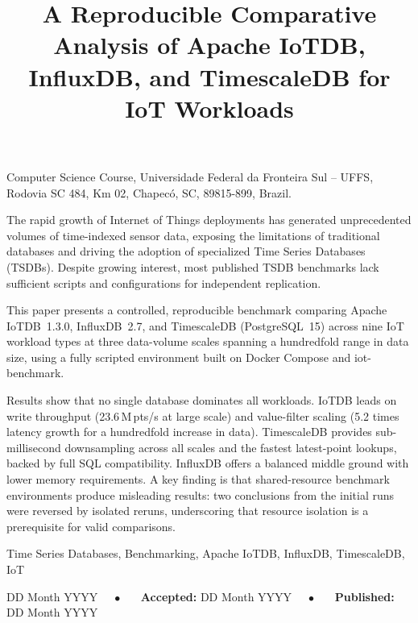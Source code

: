 \documentclass[english]{presets/sbcreviews-2025}%
\title[A Reproducible Comparative Analysis of Apache IoTDB, InfluxDB, and TimescaleDB for IoT Workloads]{A Reproducible Comparative Analysis of Apache IoTDB, InfluxDB, and TimescaleDB for IoT Workloads}
\author[Klein 2026]{
  \affil{\textbf{Luiz Fernando Klein}~\orcidlink{0009-0001-8949-3248}~\textcolor{blue}{\faEnvelope}~~[{Universidade Federal da Fronteira Sul - UFFS}~|\href{mailto: ...}{~{\textit{luizkleinfernando@gmail.com}}}~]}
}
\begin{document}
\begin{frontmatter}

  \maketitle

  \begin{mail}
    Computer Science Course, Universidade Federal da Fronteira Sul -- UFFS, Rodovia SC 484, Km 02, Chapecó, SC, 89815-899, Brazil.
  \end{mail}

  \begin{abstract-en}
    The rapid growth of Internet of Things deployments has generated unprecedented volumes of
    time-indexed sensor data, exposing the limitations of traditional databases and driving the
    adoption of specialized Time Series Databases (TSDBs). Despite growing interest, most published
    TSDB benchmarks lack sufficient scripts and configurations for independent replication.

    This paper presents a controlled, reproducible benchmark comparing Apache IoTDB~1.3.0,
    InfluxDB~2.7, and TimescaleDB (PostgreSQL~15) across nine IoT workload types at three
    data-volume scales spanning a hundredfold range in data size, using a fully scripted environment
    built on Docker Compose and iot-benchmark.

    Results show that no single database dominates all workloads. IoTDB leads on write throughput
    (23.6\,M\,pts/s at large scale) and value-filter scaling (5.2 times latency growth for
    a hundredfold increase in data). TimescaleDB provides sub-millisecond downsampling across all scales and the
    fastest latest-point lookups, backed by full SQL compatibility. InfluxDB offers a balanced
    middle ground with lower memory requirements. A key finding is that shared-resource benchmark
    environments produce misleading results: two conclusions from the initial runs were reversed
    by isolated reruns, underscoring that resource isolation is a prerequisite for valid comparisons.
  \end{abstract-en}

  \begin{keywords}
    Time Series Databases, Benchmarking, Apache IoTDB, InfluxDB, TimescaleDB, IoT
  \end{keywords}

  \begin{dates}
     DD Month YYYY~~~$\bullet$~~~
    {\sffamily\textbf{Accepted:}} DD Month YYYY~~~$\bullet$~~~
    {\sffamily\textbf{Published:}} DD Month YYYY

  \end{dates}


\end{frontmatter}
\end{document}
